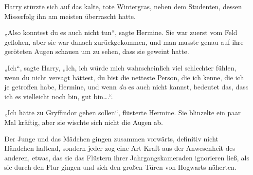 Harry stürzte sich auf das kalte, tote Wintergras, neben dem Studenten, dessen Misserfolg ihn am meisten überrascht hatte.

„Also konntest du es auch nicht tun“, sagte Hermine. Sie war zuerst vom Feld geflohen, aber sie war danach zurückgekommen, und man musste genau auf ihre geröteten Augen schauen um zu sehen, dass sie geweint hatte.

„Ich“, sagte Harry, „Ich, ich würde mich wahrscheinlich viel schlechter fühlen, wenn du nicht versagt hättest, du bist die netteste Person, die ich kenne, die ich je getroffen habe, Hermine, und wenn \emph{du} es auch nicht kannst, bedeutet das, dass ich es vielleicht noch bin, gut bin….“.

„Ich hätte zu Gryffindor gehen sollen“, flüsterte Hermine. Sie blinzelte ein paar Mal kräftig, aber sie wischte sich nicht die Augen ab.

\later

Der Junge und das Mädchen gingen zusammen vorwärts, definitiv nicht Händchen haltend, sondern jeder zog eine Art Kraft aus der Anwesenheit des anderen, etwas, das sie das Flüstern ihrer Jahrgangskameraden ignorieren ließ, als sie durch den Flur gingen und sich den großen Türen von Hogwarts näherten.

